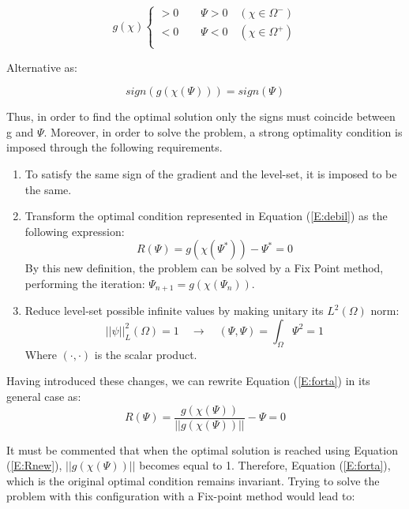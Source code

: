 \begin{equation}  
g(\chi)\left\{ 
\begin{array}{c}
>0 \qquad \Psi > 0 \quad (\chi \in \Omega^-) \\
<0 \qquad \Psi < 0 \quad (\chi \in \Omega^+) \\
\end{array} \right.
\end{equation}

Alternative as:

\begin{equation}  \label{E:debil}
sign(g(\chi(\Psi)))=sign(\Psi)
\end{equation}

Thus, in order to find the optimal solution only the signs must coincide between g and $\Psi$. Moreover, in order to solve the problem, a strong optimality condition is imposed through the following requirements.

\begin{enumerate}
\item To satisfy the same sign of the gradient and the level-set, it is imposed to be the same.
\item Transform the optimal condition represented in Equation (\ref{E:debil}) as the following expression:
\begin{equation}  \label{E:forta}
R(\Psi)=g(\chi(\Psi^*))-\Psi^*=0
\end{equation}
By this new definition, the problem can be solved by a Fix Point method, performing the iteration: $\Psi_{n+1}=g(\chi(\Psi_n))$.

\item  Reduce level-set possible infinite values by making unitary its $L^2(\Omega)$ norm:
\begin{equation}  \label{E:modul}
||\psi||_L^2(\Omega)=1 \quad \rightarrow  \quad (\Psi,\Psi )=\int_{\Omega} \Psi^2 = 1
\end{equation}
Where $(\cdot,\cdot)$ is the scalar product.
\end{enumerate}

Having introduced these changes, we can rewrite Equation (\ref{E:forta}) in its general case as:
\begin{equation}  \label{E:Rnew}
R(\Psi)=\frac{g(\chi(\Psi))}{||g(\chi(\Psi))||}-\Psi=0
\end{equation}

It must be commented that when the optimal solution is reached using Equation (\ref{E:Rnew}), $||g(\chi(\Psi))||$ becomes equal to 1. Therefore, Equation (\ref{E:forta}), which is the original optimal condition remains invariant. Trying to solve the problem with this configuration with a Fix-point method would lead to:

